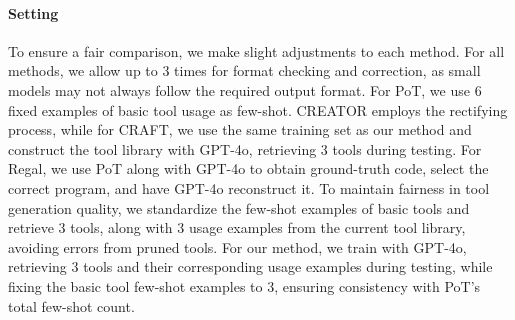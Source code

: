 \paragraph{Setting}
To ensure a fair comparison, we make slight adjustments to each method. For all methods, we allow up to 3 times for format checking and correction, as small models may not always follow the required output format. For PoT, we use 6 fixed examples of basic tool usage as few-shot. CREATOR employs the rectifying process, while for CRAFT, we use the same training set as our method and construct the tool library with GPT-4o, retrieving 3 tools during testing. For Regal, we use PoT along with GPT-4o to obtain ground-truth code, select the correct program, and have GPT-4o reconstruct it. To maintain fairness in tool generation quality, we standardize the few-shot examples of basic tools and retrieve 3 tools, along with 3 usage examples from the current tool library, avoiding errors from pruned tools. For our method, we train with GPT-4o, retrieving 3 tools and their corresponding usage examples during testing, while fixing the basic tool few-shot examples to 3, ensuring consistency with PoT’s total few-shot count.